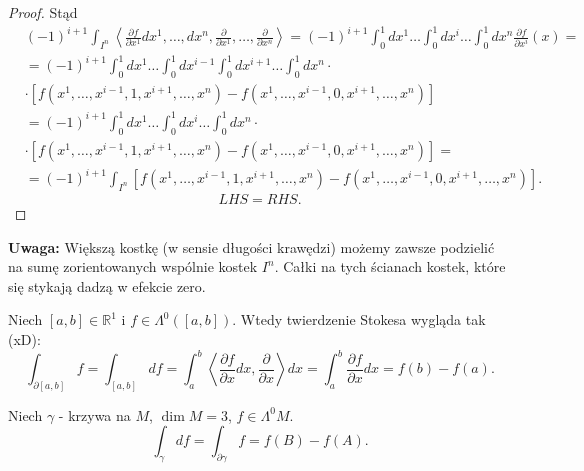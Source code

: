 \documentclass[../main.tex]{subfiles}
\begin{document}
\begin{proof}
Stąd
\begin{align*}
    &(-1)^{i+1} \int_{I^n}\left< \frac{\partial f}{\partial x^1} dx^1,\ldots,dx^n, \frac{\partial }{\partial x^1} , \ldots, \frac{\partial }{\partial x^n}  \right> = (-1)^{i+1} \int_0^1dx^1\ldots\int_0^1 dx^i\ldots\int_0^1dx^n \frac{\partial f}{\partial x^i} (x) =\\
    &= (-1)^{i+1} \int_0^1dx^1\ldots\int_0^1dx^{i-1}\int_0^1dx^{i+1}\ldots\int_0^1dx^n\cdot  \\
    &\cdot \left[ f(x^1,\ldots,x^{i-1},1,x^{i+1},\ldots,x^n) - f(x^1,\ldots,x^{i-1}, 0, x^{i+1}, \ldots, x^n) \right]  \\
    &= (-1)^{i+1}\int_0^1dx^1\ldots\int_0^1dx^i\ldots\int_0^1dx^n\cdot \\
    &\cdot \left[ f(x^1,\ldots,x^{i-1},1,x^{i+1},\ldots,x^n) - f(x^1,\ldots,x^{i-1}, 0, x^{i+1}, \ldots, x^n) \right] = \\
    &= (-1)^{i+1} \int_{I^n}\left[ f(x^1,\ldots,x^{i-1},1,x^{i+1},\ldots,x^n) - f(x^1,\ldots,x^{i-1},0,x^{i+1},\ldots,x^n) \right]
.\end{align*}
\[
LHS = RHS
.\]
\end{proof}
\textbf{Uwaga:} Większą kostkę (w sensie długości krawędzi) możemy zawsze podzielić na sumę zorientowanych wspólnie kostek $I^n$. Całki na tych ścianach kostek, które się stykają dadzą w efekcie zero.
\begin{przyklad}
    Niech $[a,b]\in \mathbb{R}^1$ i $f\in \Lambda^0\left( [a,b] \right) $. Wtedy twierdzenie Stokesa wygląda tak (xD):
    \[
        \int_{\partial[a,b]} f= \int_{[a,b]} df = \int_a^b \left<\frac{\partial f}{\partial x}dx , \frac{\partial }{\partial x}  \right>dx = \int_a^b \frac{\partial f}{\partial x} dx = f(b) - f(a)
    .\]
\end{przyklad}
\begin{przyklad}
    Niech $\gamma$ - krzywa na $M$, $\dim M = 3$, $f \in \Lambda^0M$.
     \[
         \int_\gamma df= \int_{\partial \gamma} f = f(B) - f(A)
    .\]
\end{przyklad}
\end{document}

